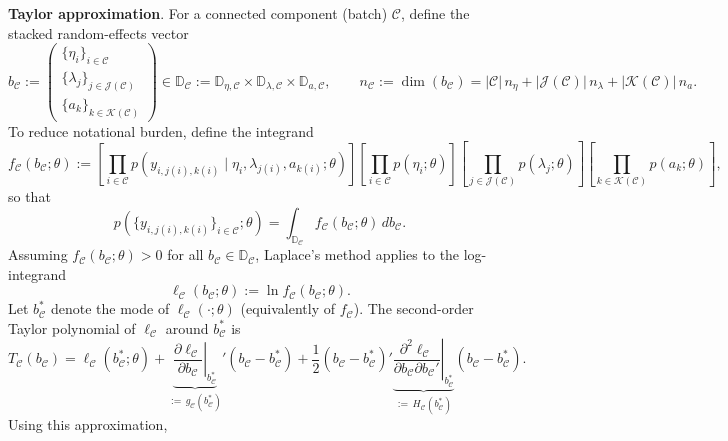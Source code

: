 \documentclass[12pt]{article}
\begin{document}
\textbf{Taylor approximation}. For a connected component (batch) \(\mathcal{C}\), define the stacked random-effects vector
\[
b_{\mathcal{C}}
:=
\begin{pmatrix}
\{\eta_i\}_{i\in\mathcal{C}}\\[2pt]
\{\lambda_j\}_{j\in\mathcal{J}(\mathcal{C})}\\[2pt]
\{a_k\}_{k\in\mathcal{K}(\mathcal{C})}
\end{pmatrix}
\in \mathbb{D}_{\mathcal{C}}
:=\mathbb{D}_{\eta,\mathcal{C}}\times \mathbb{D}_{\lambda,\mathcal{C}}\times \mathbb{D}_{a,\mathcal{C}},
\qquad 
n_{\mathcal{C}} := \dim(b_{\mathcal{C}})=|\mathcal{C}|\,n_\eta+|\mathcal{J}(\mathcal{C})|\,n_\lambda+|\mathcal{K}(\mathcal{C})|\,n_a.
\]
To reduce notational burden, define the integrand
\[
f_{\mathcal{C}}(b_{\mathcal{C}};\theta)
:=
\left[
\prod_{i\in\mathcal{C}}
p\!\left(y_{i,j(i),k(i)} \mid \eta_i,\lambda_{j(i)},a_{k(i)};\theta\right)
\right]
\left[
\prod_{i\in\mathcal{C}} p(\eta_i;\theta)
\right]
\left[
\prod_{j\in\mathcal{J}(\mathcal{C})} p(\lambda_j;\theta)
\right]
\left[
\prod_{k\in\mathcal{K}(\mathcal{C})} p(a_k;\theta)
\right],
\]
so that
\[
p\!\left(\{y_{i,j(i),k(i)}\}_{i\in\mathcal{C}};\theta\right)
=
\int_{\mathbb{D}_{\mathcal{C}}} f_{\mathcal{C}}(b_{\mathcal{C}};\theta)\, db_{\mathcal{C}}.
\]
Assuming \(f_{\mathcal{C}}(b_{\mathcal{C}};\theta)>0\) for all \(b_{\mathcal{C}}\in\mathbb{D}_{\mathcal{C}}\), Laplace's method applies to the log-integrand
\[
\ell_{\mathcal{C}}(b_{\mathcal{C}};\theta):=\ln f_{\mathcal{C}}(b_{\mathcal{C}};\theta).
\]
Let \(b_{\mathcal{C}}^*\) denote the mode of \(\ell_{\mathcal{C}}(\cdot;\theta)\) (equivalently of \(f_{\mathcal{C}}\)). The second-order Taylor polynomial of \(\ell_{\mathcal{C}}\) around \(b_{\mathcal{C}}^*\) is
\begin{equation}
\label{eq:taylor_laplace_component}
T_{\mathcal{C}}(b_{\mathcal{C}})
=
\ell_{\mathcal{C}}(b_{\mathcal{C}}^*;\theta)
+
\underbrace{\left.\frac{\partial \ell_{\mathcal{C}}}{\partial b_{\mathcal{C}}}\right\rvert_{b_{\mathcal{C}}^*}}_{:=\,g_{\mathcal{C}}(b_{\mathcal{C}}^*)}{}'
(b_{\mathcal{C}}-b_{\mathcal{C}}^*)
+
\frac{1}{2}(b_{\mathcal{C}}-b_{\mathcal{C}}^*)'
\underbrace{\left.\frac{\partial^2 \ell_{\mathcal{C}}}{\partial b_{\mathcal{C}}\partial b_{\mathcal{C}}'}\right\rvert_{b_{\mathcal{C}}^*}}_{:=\,H_{\mathcal{C}}(b_{\mathcal{C}}^*)}
(b_{\mathcal{C}}-b_{\mathcal{C}}^*).
\end{equation}
Using this approximation,
\end{document}
